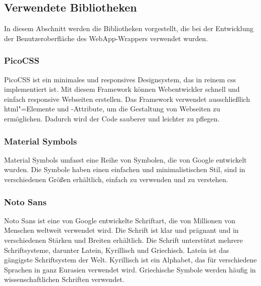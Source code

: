 \subsection{Verwendete Bibliotheken}

In diesem Abschnitt werden die Bibliotheken vorgestellt, die bei der Entwicklung der Benutzeroberfläche des WebApp-Wrappers verwendet wurden.

\subsubsection{PicoCSS}

PicoCSS ist ein minimales und responsives Designsystem, das in reinem \ac{css} implementiert ist.
Mit diesem Framework können Webentwickler schnell und einfach responsive Webseiten erstellen.
Das Framework verwendet ausschließlich \acs{html}"=Elemente und -Attribute, um die Gestaltung von Webseiten zu ermöglichen.
Dadurch wird der Code sauberer und leichter zu pflegen.
\cite{pico}

\subsubsection{Material Symbols}

Material Symbols umfasst eine Reihe von Symbolen, die von Google entwickelt wurden.
Die Symbole haben einen einfachen und minimalistischen Stil, sind in verschiedenen Größen erhältlich, einfach zu verwenden und zu verstehen.
\cite{symbols}

\subsubsection{Noto Sans}

Noto Sans ist eine von Google entwickelte Schriftart, die von Millionen von Menschen weltweit verwendet wird.
Die Schrift ist klar und prägnant und in verschiedenen Stärken und Breiten erhältlich.
Die Schrift unterstützt mehrere Schriftsysteme, darunter Latein, Kyrillisch und Griechisch.
Latein ist das gängigste Schriftsystem der Welt.
Kyrillisch ist ein Alphabet, das für verschiedene Sprachen in ganz Eurasien verwendet wird.
Griechische Symbole werden häufig in wissenschaftlichen Schriften verwendet.
\cite{noto}
